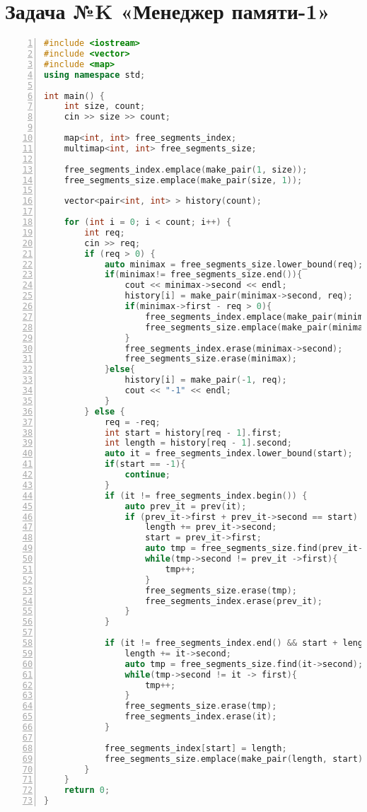 \documentclass{article}
\begin{document}
\section{Задача №K «Менеджер памяти-1»}
\begin{lstlisting}[language=C++, frame=single, basicstyle=\ttfamily, numbers=left, numberstyle=\tiny]
#include <iostream>
#include <vector>
#include <map>
using namespace std;

int main() {
    int size, count;
    cin >> size >> count;

    map<int, int> free_segments_index;
    multimap<int, int> free_segments_size;

    free_segments_index.emplace(make_pair(1, size));
    free_segments_size.emplace(make_pair(size, 1));
    
    vector<pair<int, int> > history(count);
    
    for (int i = 0; i < count; i++) {
        int req;
        cin >> req;
        if (req > 0) {
            auto minimax = free_segments_size.lower_bound(req);
            if(minimax!= free_segments_size.end()){
                cout << minimax->second << endl;
                history[i] = make_pair(minimax->second, req);
                if(minimax->first - req > 0){
                    free_segments_index.emplace(make_pair(minimax->second + req, minimax->first - req));
                    free_segments_size.emplace(make_pair(minimax->first - req, minimax->second + req));
                }
                free_segments_index.erase(minimax->second);
                free_segments_size.erase(minimax);
            }else{
                history[i] = make_pair(-1, req);
                cout << "-1" << endl;
            }
        } else {
            req = -req;
            int start = history[req - 1].first;
            int length = history[req - 1].second;
            auto it = free_segments_index.lower_bound(start);
            if(start == -1){
                continue;
            }
            if (it != free_segments_index.begin()) {
                auto prev_it = prev(it); 
                if (prev_it->first + prev_it->second == start) { 
                    length += prev_it->second;
                    start = prev_it->first;
                    auto tmp = free_segments_size.find(prev_it->second);
                    while(tmp->second != prev_it ->first){
                        tmp++;
                    }
                    free_segments_size.erase(tmp);
                    free_segments_index.erase(prev_it);
                }
            }

            if (it != free_segments_index.end() && start + length == it->first) { 
                length += it->second;
                auto tmp = free_segments_size.find(it->second);
                while(tmp->second != it -> first){
                    tmp++;
                }
                free_segments_size.erase(tmp);
                free_segments_index.erase(it);
            }

            free_segments_index[start] = length;
            free_segments_size.emplace(make_pair(length, start));
        }
    }
    return 0;
}
\end{lstlisting}
\end{document}
